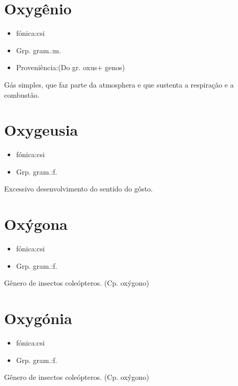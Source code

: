 \section{Oxygênio}
\begin{itemize}
\item {fónica:csi}
\end{itemize}
\begin{itemize}
\item {Grp. gram.:m.}
\end{itemize}
\begin{itemize}
\item {Proveniência:(Do gr. \textunderscore oxus\textunderscore  + \textunderscore genos\textunderscore )}
\end{itemize}
Gás simples, que faz parte da atmosphera e que sustenta a respiração e a combustão.
\section{Oxygeusia}
\begin{itemize}
\item {fónica:csi}
\end{itemize}
\begin{itemize}
\item {Grp. gram.:f.}
\end{itemize}
Excessivo desenvolvimento do sentido do gôsto.
\section{Oxýgona}
\begin{itemize}
\item {fónica:csi}
\end{itemize}
\begin{itemize}
\item {Grp. gram.:f.}
\end{itemize}
Gênero de insectos coleópteros.
(Cp. \textunderscore oxýgono\textunderscore )
\section{Oxygónia}
\begin{itemize}
\item {fónica:csi}
\end{itemize}
\begin{itemize}
\item {Grp. gram.:f.}
\end{itemize}
Gênero de insectos coleópteros.
(Cp. \textunderscore oxýgono\textunderscore )
